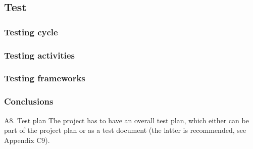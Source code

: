 \subsection{Test}

\subsubsection{Testing cycle}
\subsubsection{Testing activities}
\subsubsection{Testing frameworks}
\subsubsection{Conclusions}

A8. Test plan
The project has to have an overall test plan, which either can be part of the project plan or as a test 
document (the latter is recommended, see Appendix C9).